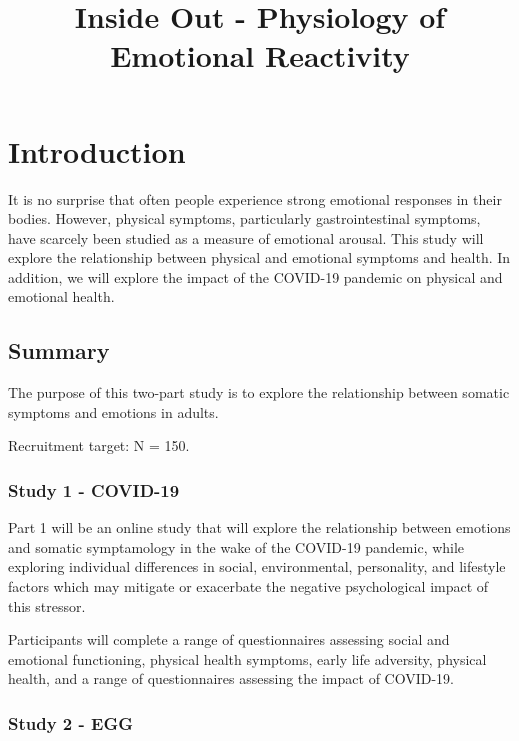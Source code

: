 \documentclass[]{book}
\title{Inside Out - Physiology of Emotional Reactivity}
\author{}
\date{\vspace{-2.5em}}
\begin{document}
\maketitle

{
\setcounter{tocdepth}{1}
\tableofcontents
}
\hypertarget{introduction}{%
\chapter{Introduction}\label{introduction}}

It is no surprise that often people experience strong emotional responses in their bodies. However, physical symptoms, particularly gastrointestinal symptoms, have scarcely been studied as a measure of emotional arousal. This study will explore the relationship between physical and emotional symptoms and health. In addition, we will explore the impact of the COVID-19 pandemic on physical and emotional health.

\hypertarget{summary}{%
\section{Summary}\label{summary}}

The purpose of this two-part study is to explore the relationship between somatic symptoms and emotions in adults.

Recruitment target: N = 150.

\hypertarget{study-1---covid-19}{%
\subsection{Study 1 - COVID-19}\label{study-1---covid-19}}

Part 1 will be an online study that will explore the relationship between emotions and somatic symptamology in the wake of the COVID-19 pandemic, while exploring individual differences in social, environmental, personality, and lifestyle factors which may mitigate or exacerbate the negative psychological impact of this stressor.

Participants will complete a range of questionnaires assessing social and emotional functioning, physical health symptoms, early life adversity, physical health, and a range of questionnaires assessing the impact of COVID-19.

\hypertarget{study-2---egg}{%
\subsection{Study 2 - EGG}\label{study-2---egg}}
\end{document}
